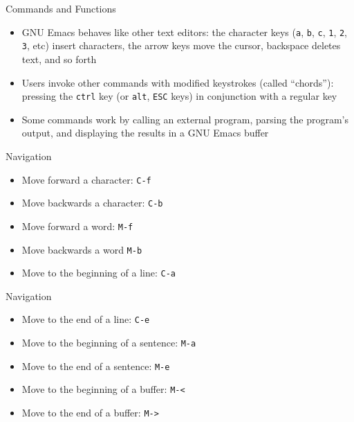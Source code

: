 \documentclass[12pt,a4paper,oneside]{beamer}
\begin{document}
\begin{frame}{Commands and Functions}
\begin{itemize}
  \item GNU Emacs behaves like other text editors: the character keys (\texttt{a}, \texttt{b}, \texttt{c}, \texttt{1}, \texttt{2}, \texttt{3}, etc) insert characters, the arrow keys move the cursor, backspace deletes text, and so forth\newline
  \item Users invoke other commands with modified keystrokes (called ``chords''): pressing the \texttt{ctrl} key (or \texttt{alt}, \texttt{ESC} keys) in conjunction with a regular key\newline
  \item Some commands work by calling an external program, parsing the program's output, and displaying the results in a GNU Emacs buffer
\end{itemize}
\end{frame}

\begin{frame}{Navigation}
\begin{itemize}
  \item Move forward a character: \texttt{C-f}\newline
  \item Move backwards a character: \texttt{C-b}\newline
  \item Move forward a word: \texttt{M-f}\newline
  \item Move backwards a word \texttt{M-b}\newline
  \item Move to the beginning of a line: \texttt{C-a}
\end{itemize}
\end{frame}

\begin{frame}{Navigation}
\begin{itemize}
  \item Move to the end of a line: \texttt{C-e}\newline
  \item Move to the beginning of a sentence: \texttt{M-a}\newline
  \item Move to the end of a sentence: \texttt{M-e}\newline
  \item Move to the beginning of a buffer: \texttt{M-<}\newline
  \item Move to the end of a buffer: \texttt{M->}
\end{itemize} 
\end{frame}
\end{document}
